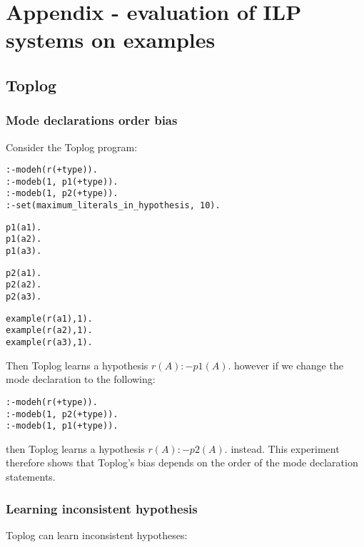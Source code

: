 \chapter{Appendix - evaluation of ILP systems on examples}

\section{Toplog}
\subsection{Mode declarations order bias}
Consider the Toplog program:

\begin{minipage}[t]{.35\textwidth}
\begin{lstlisting}
:-modeh(r(+type)).
:-modeb(1, p1(+type)).
:-modeb(1, p2(+type)).
:-set(maximum_literals_in_hypothesis, 10).
\end{lstlisting}
\end{minipage}
\begin{minipage}[t]{.20\textwidth}
\begin{lstlisting}
p1(a1).
p1(a2).
p1(a3).
\end{lstlisting}
\end{minipage}
\begin{minipage}[t]{.20\textwidth}
\begin{lstlisting}
p2(a1).
p2(a2).
p2(a3).
\end{lstlisting}
\end{minipage}
\begin{minipage}[t]{.25\textwidth}
\begin{lstlisting}
example(r(a1),1).
example(r(a2),1).
example(r(a3),1).
\end{lstlisting}
\end{minipage}


Then Toplog learns a hypothesis $r(A) :- p1(A).$ however if we change the mode declaration to the following:
\begin{lstlisting}
:-modeh(r(+type)).
:-modeb(1, p2(+type)).
:-modeb(1, p1(+type)).
\end{lstlisting}
then Toplog learns a hypothesis $r(A) :- p2(A).$ instead. This experiment therefore shows that Toplog's bias depends on the order of the mode declaration statements.

\subsection{Learning inconsistent hypothesis}
Toplog can learn inconsistent hypotheses:


